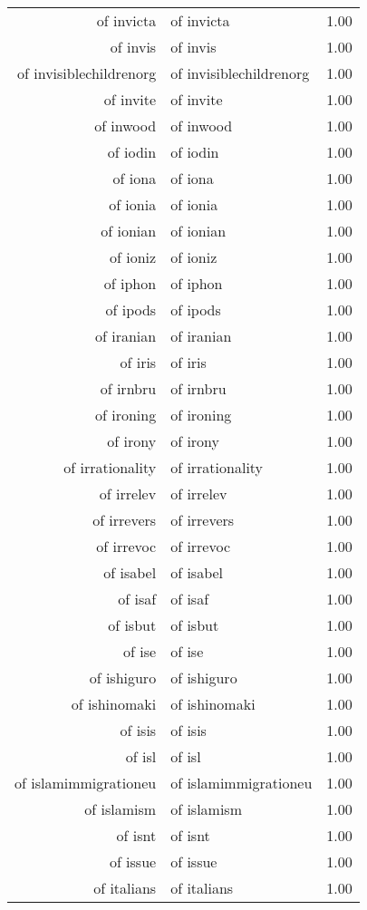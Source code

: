 \begin{table}[ht]
\begin{tabular}{rlr}
  of invicta & of invicta & 1.00 \\ 
  of invis & of invis & 1.00 \\ 
  of invisiblechildrenorg & of invisiblechildrenorg & 1.00 \\ 
  of invite & of invite & 1.00 \\ 
  of inwood & of inwood & 1.00 \\ 
  of iodin & of iodin & 1.00 \\ 
  of iona & of iona & 1.00 \\ 
  of ionia & of ionia & 1.00 \\ 
  of ionian & of ionian & 1.00 \\ 
  of ioniz & of ioniz & 1.00 \\ 
  of iphon & of iphon & 1.00 \\ 
  of ipods & of ipods & 1.00 \\ 
  of iranian & of iranian & 1.00 \\ 
  of iris & of iris & 1.00 \\ 
  of irnbru & of irnbru & 1.00 \\ 
  of ironing & of ironing & 1.00 \\ 
  of irony & of irony & 1.00 \\ 
  of irrationality & of irrationality & 1.00 \\ 
  of irrelev & of irrelev & 1.00 \\ 
  of irrevers & of irrevers & 1.00 \\ 
  of irrevoc & of irrevoc & 1.00 \\ 
  of isabel & of isabel & 1.00 \\ 
  of isaf & of isaf & 1.00 \\ 
  of isbut & of isbut & 1.00 \\ 
  of ise & of ise & 1.00 \\ 
  of ishiguro & of ishiguro & 1.00 \\ 
  of ishinomaki & of ishinomaki & 1.00 \\ 
  of isis & of isis & 1.00 \\ 
  of isl & of isl & 1.00 \\ 
  of islamimmigrationeu & of islamimmigrationeu & 1.00 \\ 
  of islamism & of islamism & 1.00 \\ 
  of isnt & of isnt & 1.00 \\ 
  of issue & of issue & 1.00 \\ 
  of italians & of italians & 1.00 \\ 

\end{tabular}
\end{table}
